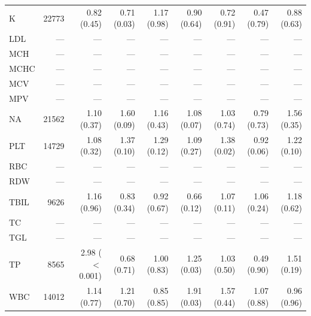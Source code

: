 \begin{table}[ht]
\begin{tabular}{lrrrrrrrr}
K & 22773 & 0.82 (0.45) & 0.71 (0.03) & 1.17 (0.98) & 0.90 (0.64) & 0.72 (0.91) & 0.47 (0.79) & 0.88 (0.63) \\
LDL & --- & --- & --- & --- & --- & --- & --- & --- \\
MCH & --- & --- & --- & --- & --- & --- & --- & --- \\
MCHC & --- & --- & --- & --- & --- & --- & --- & --- \\
MCV & --- & --- & --- & --- & --- & --- & --- & --- \\
MPV & --- & --- & --- & --- & --- & --- & --- & --- \\
NA & 21562 & 1.10 (0.37) & 1.60 (0.09) & 1.16 (0.43) & 1.08 (0.07) & 1.03 (0.74) & 0.79 (0.73) & 1.56 (0.35) \\
PLT & 14729 & 1.08 (0.32) & 1.37 (0.10) & 1.29 (0.12) & 1.09 (0.27) & 1.38 (0.02) & 0.92 (0.06) & 1.22 (0.10) \\
RBC & --- & --- & --- & --- & --- & --- & --- & --- \\
RDW & --- & --- & --- & --- & --- & --- & --- & --- \\
TBIL & 9626 & 1.16 (0.96) & 0.83 (0.34) & 0.92 (0.67) & 0.66 (0.12) & 1.07 (0.11) & 1.06 (0.24) & 1.18 (0.62) \\
TC & --- & --- & --- & --- & --- & --- & --- & --- \\
TGL & --- & --- & --- & --- & --- & --- & --- & --- \\
TP & 8565 & 2.98 ($<$0.001) & 0.68 (0.71) & 1.00 (0.83) & 1.25 (0.03) & 1.03 (0.50) & 0.49 (0.90) & 1.51 (0.19) \\
WBC & 14012 & 1.14 (0.77) & 1.21 (0.70) & 0.85 (0.85) & 1.91 (0.03) & 1.57 (0.44) & 1.07 (0.88) & 0.96 (0.96) \\
\bottomrule
\end{tabular}
\label{tab:17_incidence_inspire_periop_infection}
\end{table}